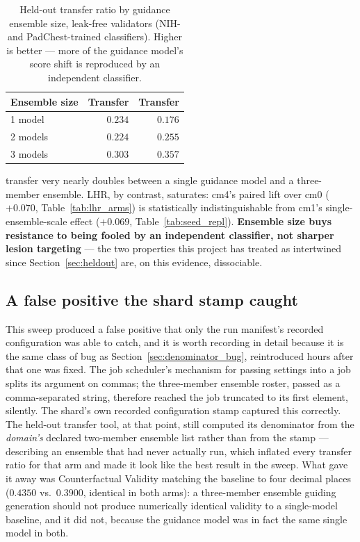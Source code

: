 \begin{table}[h]
\centering
\caption[Ensemble-size sweep: held-out transfer]{Held-out transfer ratio by
guidance ensemble size, leak-free validators (NIH- and PadChest-trained
classifiers). Higher is better --- more of the guidance model's score
shift is reproduced by an independent classifier.}
\label{tab:ensemble_sweep}
\begin{tabular}{@{}lrr@{}}
\toprule
\textbf{Ensemble size} & \textbf{Transfer \ntop{}} & \textbf{Transfer \pton{}} \\
\midrule
1 model  & $0.234$ & $0.176$ \\
2 models & $0.224$ & $0.255$ \\
3 models & $0.303$ & $0.357$ \\
\bottomrule
\end{tabular}
\end{table}

\pton{} transfer very nearly doubles between a single guidance model and a
three-member ensemble. LHR, by contrast, saturates: cm4's paired lift over
cm0 ($+0.070$, Table~\ref{tab:lhr_arms}) is statistically indistinguishable
from cm1's single-ensemble-scale effect ($+0.069$,
Table~\ref{tab:seed_repl}). \textbf{Ensemble size buys resistance to being
fooled by an independent classifier, not sharper lesion targeting} --- the
two properties this project has treated as intertwined since
Section~\ref{sec:heldout} are, on this evidence, dissociable.

\subsection{A false positive the shard stamp caught}

This sweep produced a false positive that only the run manifest's
recorded configuration was able to catch, and it is worth recording in
detail because it is the same class of bug as
Section~\ref{sec:denominator_bug}, reintroduced hours after that one was
fixed. The job scheduler's mechanism for passing settings into a job
splits its argument on commas; the three-member ensemble roster, passed
as a comma-separated string, therefore reached the job truncated to its
first element, silently. The shard's own recorded configuration stamp
captured this correctly. The held-out transfer tool, at that point,
still computed its denominator from the \emph{domain's} declared
two-member ensemble list rather than from the stamp --- describing an
ensemble that had never actually run, which inflated every transfer
ratio for that arm and made it look like the best result in the sweep.
What gave it away was Counterfactual Validity matching the baseline to
four decimal places ($0.4350$ vs.\ $0.3900$, identical in both arms): a
three-member ensemble guiding generation should not produce numerically
identical validity to a single-model baseline, and it did not, because
the guidance model was in fact the same single model in both.

